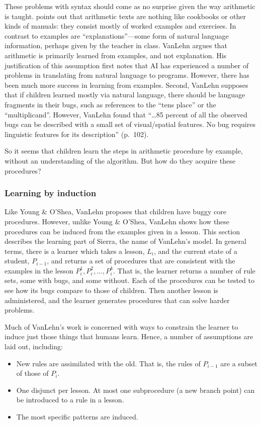These problems with syntax should come as no surprise given the way
arithmetic is taught.  points out that arithmetic
texts are nothing like cookbooks or other kinds of manuals: they consist
mostly of worked examples and exercises.  In contrast to examples are
``explanations''---some
form of natural language information, perhaps given
by the teacher in class.
VanLehn argues \citeyear[pp.~96--103]{mindbugs} that arithmetic is
primarily learned from examples, and not explanation.  His justification
of this assumption first notes that AI has experienced a number of
problems in translating from natural language to programs.  However,
there has been much more success in learning from examples.  Second,
VanLehn supposes that if children learned mostly via
natural language, there should be language fragments in their bugs, such as
references to the ``tens place'' or the ``multiplicand''.
However, VanLehn found that
``\ldots 85 percent of all the observed bugs can be described with a
small set of visual/spatial features.  No bug requires linguistic
features for its description'' (p.~102).

So it seems that children learn the steps in arithmetic procedure by
example, without an understanding of the algorithm. But how do
they acquire these procedures?

\subsubsection{Learning by induction}\label{s:induct}

Like Young \& O'Shea, VanLehn proposes that children have buggy core
procedures.  However, unlike Young \& O'Shea, VanLehn shows how these
procedures can be induced
from the examples given in a lesson.  This section
describes the learning part of Sierra, the name of VanLehn's
model. In
general terms, there
is a learner which takes a lesson, $L_i$, and the current state of a
student, $P_{i-1}$, and returns a set of procedures that are consistent
with the examples in the lesson ${P_i^1, P_i^2,\ldots,P_i^k}$.
That is, the learner returns a
number of rule sets, some with bugs, and some without.  Each of the
procedures can be tested to see how its bugs compare to those of children.
Then another lesson is administered, and the learner
generates procedures that can solve harder problems.

Much of VanLehn's \citeyear{mindbugs} work is concerned with ways to
constrain the learner
to induce just those things that humans learn.  Hence, a number of
assumptions are laid out, including:
\begin{itemize}
\item New rules are assimilated with the old. That is, the rules of
$P_{i-1}$ are a subset of those of $P_i$.
\item One disjunct per lesson.  At most one subprocedure (a new branch
point) can be introduced to a rule in a lesson.
\item The most specific patterns are induced.
\end{itemize}


